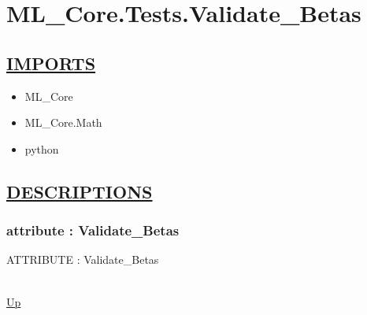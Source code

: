 \chapter*{ML\_Core.Tests.Validate\_Betas}
\hypertarget{ML_Core.Tests.Validate_Betas}{}

\section*{\underline{IMPORTS}}
\begin{itemize}
\item ML\_Core
\item ML\_Core.Math
\item python
\end{itemize}

\section*{\underline{DESCRIPTIONS}}
\subsection*{attribute : Validate\_Betas}
\hypertarget{ecldoc:ml_core.tests.validate_betas}{ATTRIBUTE : Validate\_Betas} \\
\hyperlink{ecldoc:}{Up} \\
\par
